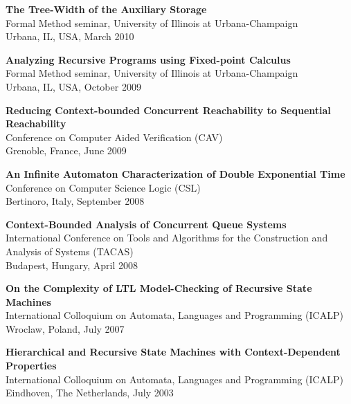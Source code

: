 \begin{resume}
{\bf The Tree-Width of the Auxiliary Storage}\\
Formal Method seminar,
University of Illinois at Urbana-Champaign\\
Urbana, IL, USA, March 2010


{\bf Analyzing Recursive Programs using Fixed-point Calculus}\\
Formal Method seminar,
University of Illinois at Urbana-Champaign\\
Urbana, IL, USA, October 2009

{\bf Reducing Context-bounded Concurrent Reachability to Sequential Reachability}\\
Conference on Computer Aided Verification (CAV)\\
Grenoble, France, June 2009


{\bf An Infinite Automaton Characterization of Double Exponential Time}\\
Conference on Computer Science Logic (CSL)\\
Bertinoro, Italy, September  2008

{\bf Context-Bounded Analysis of Concurrent Queue Systems} \\
International Conference on Tools and Algorithms for the Construction and Analysis of Systems (TACAS)\\ Budapest, Hungary, April 2008

{\bf On the Complexity of LTL Model-Checking of Recursive State Machines}\\
International Colloquium on Automata, Languages and Programming (ICALP)\\
Wroclaw, Poland, July 2007

{\bf Hierarchical and Recursive State Machines with Context-Dependent Properties}\\
International Colloquium on Automata, Languages and Programming (ICALP)\\ Eindhoven, The Netherlands, July 2003







\end{resume}
